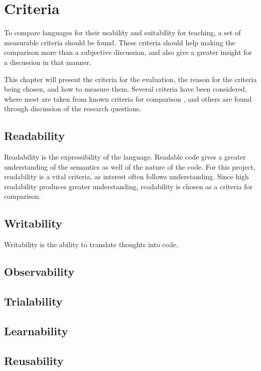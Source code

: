 \chapter{Criteria}
\label{chap:criteria}
To compare languages for their usability and suitability for teaching, a set of measurable criteria should be found. These criteria should help making the comparison more than a subjective discussion, and also give a greater insight for a discussion in that manner.

This chapter will present the criteria for the evaluation, the reason for the criteria being chosen, and how to measure them. Several criteria have been considered, where most are taken from known criteria for comparison \cite{design_criteria1} \cite{design_criteria2}, and others are found through discussion of the research questions.

\section{Readability}
Readability is the expressibility of the language. Readable code gives a greater understanding of the semantics as well of the nature of the code. For this project, readability is a vital criteria, as interest often follows understanding. Since high readability produces greater understanding, readability is chosen as a criteria for comparison.


\section{Writability}
Writability is the ability to translate thoughts into code.

\section{Observability}


\section{Trialability}


\section{Learnability}


\section{Reusability}


